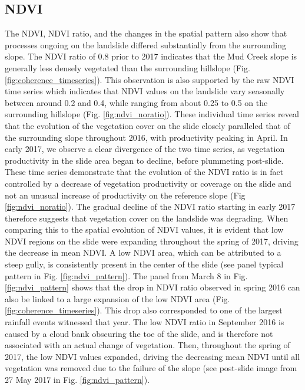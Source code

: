 \documentclass[nhess, manuscript]{copernicus}
\begin{document}



\subsection{NDVI}
The NDVI, NDVI ratio, and the changes in the spatial pattern also show that processes ongoing on the landslide differed substantially from the surrounding slope. The NDVI ratio of 0.8 prior to 2017 indicates that the Mud Creek slope is generally less densely vegetated than the surrounding hillslope (Fig. \ref{fig:coherence_timeseries}). This observation is also supported by the raw NDVI time series which indicates that NDVI values on the landslide vary seasonally between around 0.2 and 0.4, while ranging from about 0.25 to 0.5 on the surrounding hillslope (Fig. \ref{fig:ndvi_noratio}). These individual time series reveal that the evolution of the vegetation cover on the slide closely paralleled that of the surrounding slope throughout 2016, with productivity peaking in April. In early 2017, we observe a clear divergence of the two time series, as vegetation productivity in the slide area began to decline, before plummeting post-slide. These time series demonstrate that the evolution of the NDVI ratio is in fact controlled by a decrease of vegetation productivity or coverage on the slide and not an unusual increase of productivity on the reference slope (Fig \ref{fig:ndvi_noratio}). 
The gradual decline of the NDVI ratio starting in early 2017 therefore suggests that vegetation cover on the landslide was degrading. When comparing this to the spatial evolution of NDVI values, it is evident that low NDVI regions on the slide were expanding throughout the spring of 2017, driving the decrease in mean NDVI. A low NDVI area, which can be attributed to a steep gully, is consistently present in the center of the slide (see panel typical pattern in Fig. \ref{fig:ndvi_pattern}). The panel from March 8 in Fig. \ref{fig:ndvi_pattern} shows that the drop in NDVI ratio observed in spring 2016 can also be linked to a large expansion of the low NDVI area (Fig. \ref{fig:coherence_timeseries}). This drop also corresponded to one of the largest rainfall events witnessed that year. The low NDVI ratio in September 2016 is caused by a cloud bank obscuring the toe of the slide, and is therefore not associated with an actual change of vegetation. Then, throughout the spring of 2017, the low NDVI values expanded, driving the decreasing mean NDVI until all vegetation was removed due to the failure of the slope (see post-slide image from 27 May 2017 in Fig. \ref{fig:ndvi_pattern}).    \par
 
\end{document}
